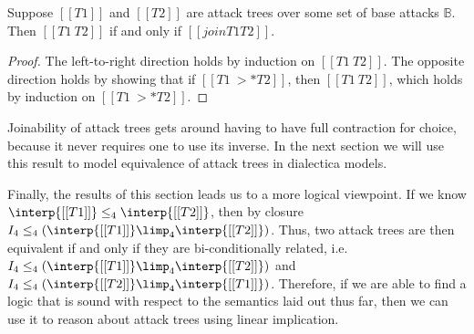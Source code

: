 \begin{lemma}
  \label{lemma:equivalence_of_attack_trees_and_joinability}
  Suppose $[[T1]]$ and $[[T2]]$ are attack trees over some set of base
  attacks $\mathbb{B}$.  Then $[[T1 ~ T2]]$ if and only if $[[join T1
      T2]]$.
\end{lemma}
\begin{proof}
  The left-to-right direction holds by induction on $[[T1 ~ T2]]$.
  The opposite direction holds by showing that if $[[T1 ~>* T2]]$,
  then $[[T1 ~ T2]]$, which holds by induction on $[[T1 ~>* T2]]$. 
\end{proof}
Joinability of attack trees gets around having to have full
contraction for choice, because it never requires one to use its
inverse.  In the next section we will use this result to model
equivalence of attack trees in dialectica models.

Finally, the results of this section leads us to a more logical
viewpoint.  If we know $\interp{[[T1]]} \leq_4 \interp{[[T2]]}$, then
by closure $I_4 \leq_4 (\interp{[[T1]]} \limp_4 \interp{[[T2]]})$.
Thus, two attack trees are then equivalent if and only if they are
bi-conditionally related, i.e. $I_4 \leq_4 (\interp{[[T1]]} \limp_4
\interp{[[T2]]})$ and $I_4 \leq_4 (\interp{[[T2]]} \limp_4
\interp{[[T1]]})$.  Therefore, if we are able to find a logic that is
sound with respect to the semantics laid out thus far, then we can use
it to reason about attack trees using linear implication.

